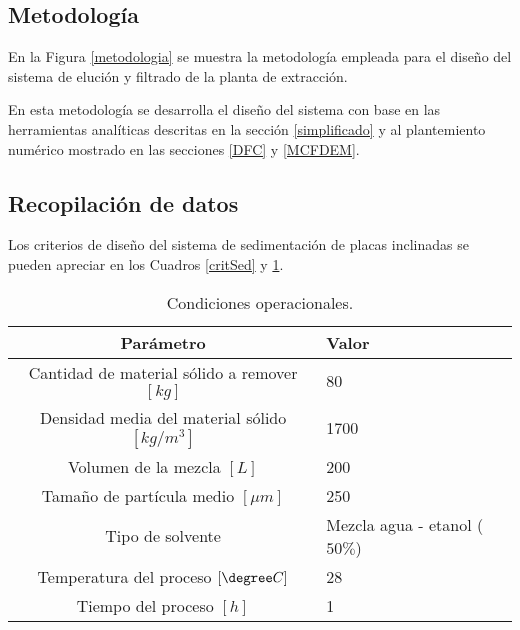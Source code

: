 \begin{center}
	\section{Metodolog\'ia}
\end{center}

\noindent
\justify

En la Figura \ref{metodologia} se muestra la metodolog\'ia empleada para el dise\~no del sistema de eluci\'on y filtrado de la planta de extracci\'on.



\noindent
\justify

En esta metodolog\'ia se desarrolla el dise\~no del sistema con base en las herramientas anal\'iticas descritas en la secci\'on \ref{simplificado} y al plantemiento num\'erico mostrado en las secciones \ref{DFC} y \ref{MCFDEM}.

\subsection{Recopilaci\'on de datos}

\noindent
\justify

Los criterios de dise\~no del sistema de sedimentaci\'on de placas inclinadas se pueden apreciar en los Cuadros \ref{critSed} y \ref{condiciones}.

\begin{table}[h!]
	\centering
	\begin{tabular}{c|p{4cm}}
		\hline
		\textbf{Par\'ametro} & \textbf{Valor} \\ \hline
		Cantidad de material s\'olido a remover $[kg]$ & 80 \\ \hline
		Densidad media del material s\'olido $\left[kg / m^3 \right]$ & 1700 \\ \hline
		Volumen de la mezcla $[L]$ & 200 \\ \hline
		Tama\~no de part\'icula medio $[\mu m]$ & 250 \\ \hline
		Tipo de solvente & Mezcla agua - etanol ($50 \%$) \\ \hline
		Temperatura del proceso $[\degree C]$ & 28 \\ \hline
		Tiempo del proceso $[h]$ & 1 \\ \hline
	\end{tabular}
	\caption{Condiciones operacionales.}
	\label{condiciones}
\end{table}



